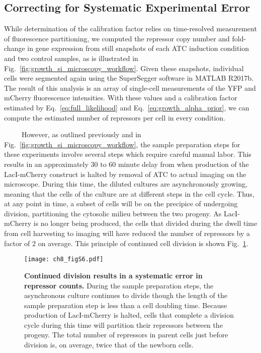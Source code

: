 \documentclass[12pt]{caltech_thesis}
\begin{document}
\hypertarget{correcting-for-systematic-experimental-error}{%
\subsection{Correcting for Systematic Experimental
Error}\label{correcting-for-systematic-experimental-error}}

While determination of the calibration factor relies on time-resolved
measurement of fluorescence partitioning, we computed the repressor copy
number and fold-change in gene expression from still snapshots of each
ATC induction condition and two control samples, as is illustrated in
Fig.~\ref{fig:growth_si_microscopy_workflow}. Given these snapshots,
individual cells were segmented again using the SuperSegger software in
MATLAB R2017b. The result of this analysis is an array of single-cell
measurements of the YFP and mCherry fluorescence intensities. With these
values and a calibration factor estimated by
Eq.~\ref{eq:full_likelihood} and Eq.~\ref{eq:growth_alpha_prior}, we can
compute the estimated number of repressors per cell in every condition.

~~~~~However, as outlined previously and in
Fig.~\ref{fig:growth_si_microscopy_workflow}, the sample preparation
steps for these experiments involve several steps which require careful
manual labor. This results in an approximately 30 to 60 minute delay
from when production of the LacI-mCherry construct is halted by removal
of ATC to actual imaging on the microscope. During this time, the
diluted cultures are asynchronously growing, meaning that the cells of
the culture are at different steps in the cell cycle. Thus, at any point
in time, a subset of cells will be on the precipice of undergoing
division, partitioning the cytosolic milieu between the two progeny. As
LacI-mCherry is no longer being produced, the cells that divided during
the dwell time from cell harvesting to imaging will have reduced the
number of repressors by a factor of 2 on average. This principle of
continued cell division is shown Fig.~\ref{fig:correction_origin}.

\hypertarget{fig:correction_origin}{%
\begin{figure}
\centering
\texttt{[image: ch8\_figS6.pdf]}
\caption[{Origin of a systematic error in repressor counting due to
continued growth.}]{\textbf{Continued division results in a systematic
error in repressor counts.} During the sample preparation steps, the
asynchronous culture continues to divide though the length of the sample
preparation step is less than a cell doubling time. Because production
of LacI-mCherry is halted, cells that complete a division cycle during
this time will partition their repressors between the progeny. The total
number of repressors in parent cells just before division is, on
average, twice that of the newborn cells.}
\label{fig:correction_origin}
\end{figure}
}
\end{document}
